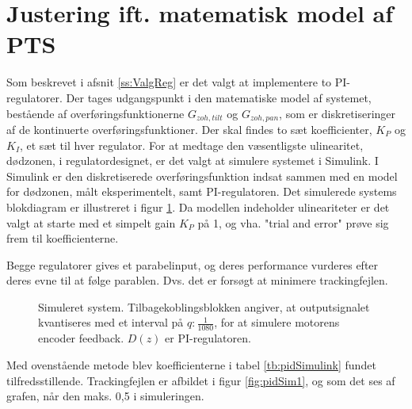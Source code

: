 \section{Justering ift. matematisk model af PTS}
\label{ss:regulatorMat}
Som beskrevet i afsnit \ref{ss:ValgReg} er det valgt at implementere to PI-regulatorer.
Der tages udgangspunkt i den matematiske model af systemet, bestående af overføringsfunktionerne
\(G_{zoh,tilt}\) og \(G_{zoh,pan}\), som er diskretiseringer af de kontinuerte overføringsfunktioner.
Der skal findes to sæt koefficienter, \(K_P\) og \(K_I\), et sæt til hver regulator.
For at medtage den væsentligste ulinearitet, dødzonen, i regulatordesignet,
er det valgt at simulere systemet i Simulink.
I Simulink er den diskretiserede overføringsfunktion indsat sammen med en model for dødzonen,
målt eksperimentelt, samt PI-regulatoren. Det simulerede systems blokdiagram er illustreret i figur \ref{fig:simulink1}.
Da modellen indeholder ulineariteter er det valgt at starte med et simpelt gain \(K_P\) på 1,
og vha. "trial and error" prøve sig frem til koefficienterne.


Begge regulatorer gives et parabelinput, og deres performance vurderes
efter deres evne til at følge parablen. Dvs. det er forsøgt at minimere trackingfejlen.

\begin{figure}[!th]
\centering
\begin{tikzpicture}[auto, node distance=2.6cm,>=latex']

\end{tikzpicture}
\caption[Simuleret system]
		{Simuleret system. Tilbagekoblingsblokken angiver, at outputsignalet kvantiseres med et interval på \(q\mathrm{:} \frac{1}{1080}\),
		for at simulere motorens encoder feedback.
		\(D\left(z\right)\) er PI-regulatoren.}
\label{fig:simulink1}
\end{figure}


Med ovenstående metode blev koefficienterne i tabel \ref{tb:pidSimulink} fundet tilfredsstillende.
Trackingfejlen er afbildet i figur \ref{fig:pidSim1}, og som det ses af grafen, når den maks. 0,5\degree{} i simuleringen.

